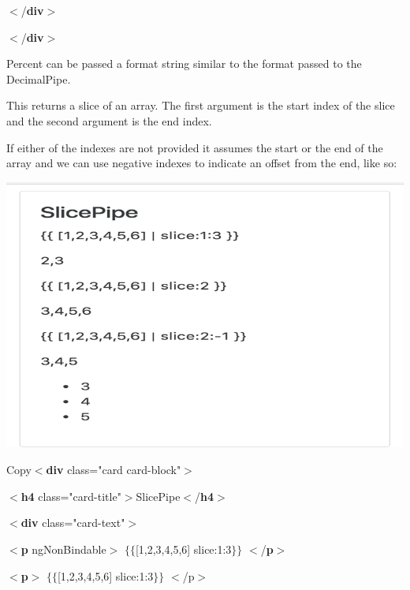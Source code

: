 \documentclass{article}
\begin{document}
$\mathrm{<}$/\textbf{div}$\mathrm{>}$

\noindent $\mathrm{<}$/\textbf{div}$\mathrm{>}$

\noindent Percent can be passed a format string similar to the format passed to the DecimalPipe.

\noindent 

\noindent 
\newpage
{}

\noindent This returns a slice of an array. The first argument is the start index of the slice and the second argument is the end index.

\noindent If either of the indexes are not provided it assumes the start or the end of the array and we can use negative indexes to indicate an offset from the end, like so:

\begin{center}
	\noindent \includegraphics*[width=5.27in, height=3.51in]{IMG-03-08}
\end{center}

\noindent 

\noindent Copy$\mathrm{<}$\textbf{div} class="card card-block"$\mathrm{>}$

$\mathrm{<}$\textbf{h4} class="card-title"$\mathrm{>}$SlicePipe$\mathrm{<}$/\textbf{h4}$\mathrm{>}$

$\mathrm{<}$\textbf{div} class="card-text"$\mathrm{>}$

$\mathrm{<}$\textbf{p} ngNonBindable$\mathrm{>}$ $\mathrm{\{}$$\mathrm{\{}$[1,2,3,4,5,6] {\textbar} slice:1:3$\mathrm{\}}$$\mathrm{\}}$ $\mathrm{<}$/\textbf{p}$\mathrm{>}$

$\mathrm{<}$\textbf{p}$\mathrm{>}$ $\mathrm{\{}$$\mathrm{\{}$[1,2,3,4,5,6] {\textbar} slice:1:3$\mathrm{\}}$$\mathrm{\}}$ $\mathrm{<}$/p$\mathrm{>}$
\end{document}
